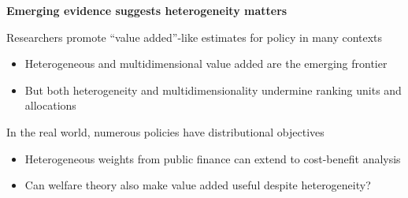 \documentclass[t,aspectratio=169,11pt,presentation]{beamer}
\newenvironment{wideitemize}{\itemize\addtolength{\itemsep}{14pt}}{\enditemize}
\begin{document}
\begin{frame}{\textbf{Emerging evidence suggests heterogeneity matters} }

\begin{wideitemize}
    \item Researchers promote ``value added''-like estimates for policy in many contexts
        \begin{itemize}
        \item <2-> Heterogeneous and multidimensional value added are the emerging frontier

       {\tiny \color{gray} \citep[]{jackson2018test,pope2017multidimensional,Delgado2020,ahn2021importance,bates2022teacher,Dahlstrand2022defying}}

       \item<3->But both heterogeneity and multidimensionality undermine ranking units and allocations
    
        {\tiny \color{gray} \citep[]{condie2014teacher}}
        \end{itemize}
    
    
    \item<4-> In the real world, numerous policies have distributional objectives 
        \begin{itemize}
        \item<5-> Heterogeneous weights from public finance can extend to cost-benefit analysis
        
        {\tiny \color{gray} \citep[]{adler2016benefit,fleurbaey2016use}}
        \item<6-> Can welfare theory also make value added useful despite heterogeneity?
    \end{itemize}

    
   
\end{wideitemize}

\end{frame}
\end{document}
